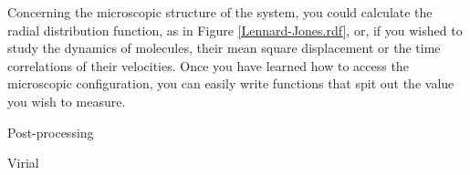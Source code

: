 Concerning the microscopic structure of the system, you could calculate the 
radial distribution function, as in Figure \ref{Lennard-Jones.rdf}, or, if you 
wished to study the dynamics of molecules, their mean square displacement or the 
time correlations of their velocities. Once you have learned how to access the 
microscopic configuration, you can easily write functions that spit out the 
value you wish to measure.



Post-processing


Virial

